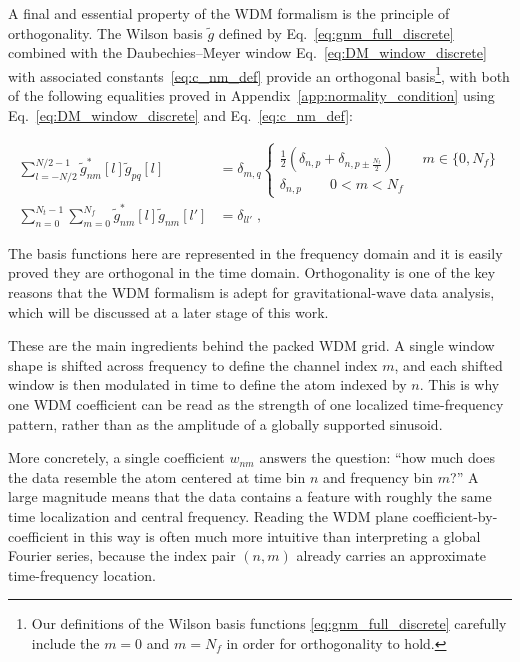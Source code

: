 \documentclass[twocolumn,preprintnumbers,
  superscriptaddress,
  nofootinbib,
  amsmath,
  amssymb,
  aps,
  prd,
  colorlinks=true,
  linkcolor=blue,
  urlcolor=blue,
  citecolor=blue,
  anchorcolor=blue
]{revtex4-2}
\begin{document}
A final and essential property of the WDM formalism is the principle of orthogonality. The Wilson basis $\tilde{g}$ defined by Eq.~\eqref{eq:gnm_full_discrete} combined with the Daubechies--Meyer window Eq.~\eqref{eq:DM_window_discrete} with associated constants~\eqref{eq:c_nm_def} provide an orthogonal basis\footnote{Our definitions of the Wilson basis functions \eqref{eq:gnm_full_discrete} carefully include the $m=0$ and $m = N_f$ in order for orthogonality to hold.}, with both of the following equalities proved in Appendix~\ref{app:normality_condition} using Eq.~\eqref{eq:DM_window_discrete} and Eq.~\eqref{eq:c_nm_def}:%
\begin{widetext}
\begin{align}\label{eq:orthonormality}
\sum_{l=-N/2}^{N/2-1}\tilde{g}^*_{nm}[l]\tilde{g}_{pq}[l]&=\delta_{m,q}\begin{cases}
    \frac{1}{2}\left(\delta_{n,p}+\delta_{n,p\pm \frac{N_t}{2}}\right) \qquad m\in\{0,N_f\}\\
    \delta_{n,p} \qquad 0<m<N_f
\end{cases}\nonumber\\
\sum_{n=0}^{N_t-1}\sum_{m=0}^{N_f}\tilde{g}^*_{nm}[l]\tilde{g}_{nm}[l']&=\delta_{ll'}\;,
\end{align}
\end{widetext}

The basis functions here are represented in the frequency domain and it is easily proved they are orthogonal in the time domain.
Orthogonality is one of the key reasons that the WDM formalism is adept for gravitational-wave data analysis, which will be discussed at a later stage of this work.



These are the main ingredients behind the packed WDM grid. A single window shape is shifted across
frequency to define the channel index $m$, and each shifted window is then modulated in time to define the atom indexed by $n$. This is why one WDM coefficient can be read as the strength of one localized time-frequency pattern, rather than as the amplitude of a globally supported sinusoid. 

More concretely, a single coefficient $w_{nm}$ answers the question:
``how much does the data resemble the atom centered at time bin $n$
and frequency bin $m$?'' A large magnitude means that the data
contains a feature with roughly the same time localization and central
frequency. 
Reading the WDM plane coefficient-by-coefficient in this way is often much more
intuitive than interpreting a global Fourier series, because the
index pair $(n,m)$ already carries an approximate time-frequency location.
\end{document}
